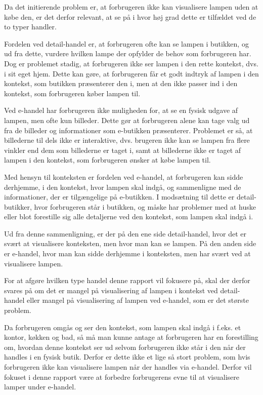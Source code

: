 Da det initierende problem er, at forbrugeren ikke kan visualisere lampen uden at købe den, er det derfor relevant, at se på i hvor høj grad dette er tilfældet ved de to typer handler.

Fordelen ved detail-handel er, at forbrugeren ofte kan se lampen i butikken, og ud fra dette, vurdere hvilken lampe der opfylder de behov som forbrugeren har. Dog er problemet stadig, at forbrugeren ikke ser lampen i den rette kontekst, dvs. i sit eget hjem. Dette kan gøre, at forbrugeren får et godt indtryk af lampen i den kontekst, som butikken præsenterer den i, men at den ikke passer ind i den kontekst, som forbrugeren køber lampen til.

Ved e-handel har forbrugeren ikke muligheden for, at se en fysisk udgave af lampen, men ofte kun billeder. Dette gør at forbrugeren alene kan tage valg ud fra de billeder og informationer som e-butikken præsenterer. Problemet er så, at billederne til dels ikke er interaktive, dvs. brugeren ikke kan se lampen fra flere vinkler end dem som billederne er taget i, samt at billederne ikke er taget af lampen i den kontekst, som forbrugeren ønsker at købe lampen til. 

Med hensyn til konteksten er fordelen ved e-handel, at forbrugeren kan sidde derhjemme, i den kontekst, hvor lampen skal indgå, og sammenligne med de informationer, der er tilgængelige på e-butikken. I modsætning til dette er detail-butikker, hvor forbrugeren står i butikken, og måske har problemer med at huske eller blot forestille sig alle detaljerne ved den kontekst, som lampen skal indgå i.

Ud fra denne sammenligning, er der på den ene side detail-handel, hvor det er svært at visualisere konteksten, men hvor man kan se lampen. På den anden side er e-handel, hvor man kan sidde derhjemme i konteksten, men har svært ved at visualisere lampen. 

For at afgøre hvilken type handel denne rapport vil fokusere på, skal der derfor svares på om det er mangel på visualisering af lampen i kontekst ved detail-handel eller mangel på visualisering af lampen ved e-handel, som er det største problem.

Da forbrugeren omgås og ser den kontekst, som lampen skal indgå i f.eks. et kontor, køkken og bad, så må man kunne antage at forbrugeren har en forestilling om, hvordan denne kontekst ser ud selvom forbrugeren ikke står i den når der handles i en fysisk butik. Derfor er dette ikke et lige så stort problem, som hvis forbrugeren ikke kan visualisere lampen når der handles via e-handel. Derfor vil fokuset i denne rapport være at forbedre forbrugerens evne til at visualisere lamper under e-handel.

